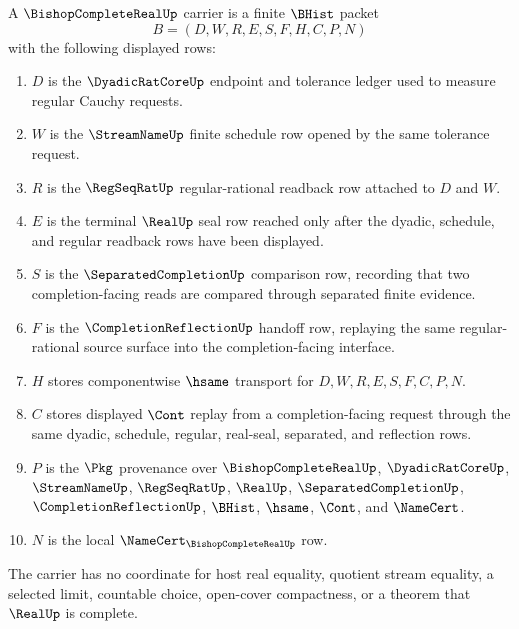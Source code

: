 \begin{definition}
\label{def:bishop-complete-real-carrier}
A $\BishopCompleteRealUp$ carrier is a finite $\BHist$ packet
$$
B=(D,W,R,E,S,F,H,C,P,N)
$$
with the following displayed rows:
\begin{enumerate}
\item $D$ is the $\DyadicRatCoreUp$ endpoint and tolerance ledger used to measure regular Cauchy requests.
\item $W$ is the $\StreamNameUp$ finite schedule row opened by the same tolerance request.
\item $R$ is the $\RegSeqRatUp$ regular-rational readback row attached to $D$ and $W$.
\item $E$ is the terminal $\RealUp$ seal row reached only after the dyadic, schedule, and regular readback rows have been displayed.
\item $S$ is the $\SeparatedCompletionUp$ comparison row, recording that two completion-facing reads are compared through separated finite evidence.
\item $F$ is the $\CompletionReflectionUp$ handoff row, replaying the same regular-rational source surface into the completion-facing interface.
\item $H$ stores componentwise $\hsame$ transport for $D,W,R,E,S,F,C,P,N$.
\item $C$ stores displayed $\Cont$ replay from a completion-facing request through the same dyadic, schedule, regular, real-seal, separated, and reflection rows.
\item $P$ is the $\Pkg$ provenance over $\BishopCompleteRealUp$, $\DyadicRatCoreUp$, $\StreamNameUp$, $\RegSeqRatUp$, $\RealUp$, $\SeparatedCompletionUp$, $\CompletionReflectionUp$, $\BHist$, $\hsame$, $\Cont$, and $\NameCert$.
\item $N$ is the local $\NameCert_{\BishopCompleteRealUp}$ row.
\end{enumerate}
The carrier has no coordinate for host real equality, quotient stream equality, a selected limit, countable choice, open-cover compactness, or a theorem that $\RealUp$ is complete.
\end{definition}

